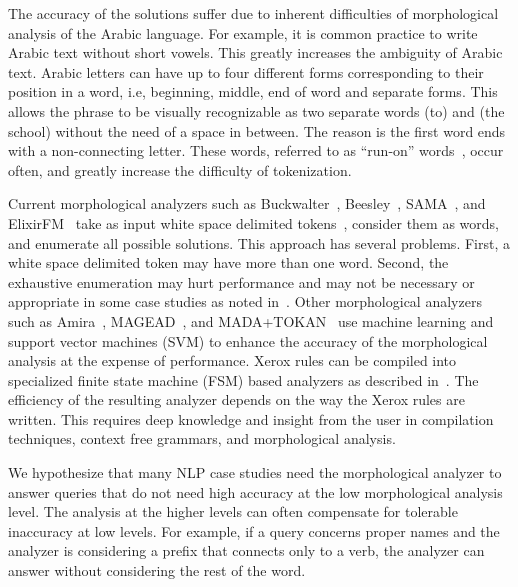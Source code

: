 \documentclass[11pt]{article}
\begin{document}
\novocalize
The accuracy of the solutions suffer due to inherent difficulties
of morphological analysis of the Arabic language. 
For example, it is common practice to write Arabic text
without short vowels. 
This greatly increases the ambiguity of Arabic text. 
Arabic letters can have up to 
four different forms
corresponding to their position in a word, i.e, beginning,
middle, end of word and separate forms. 
This allows the phrase \transfalse
{} \transtrue
to be visually recognizable
as two separate words  (to) and  (the school) 
without the need of a space in between. 
The reason is the first word  ends with
 a non-connecting letter. 
These words,
referred to as ``run-on'' words~\cite{Buckwalter:04},
occur often, and greatly increase the
difficulty of tokenization.

Current morphological analyzers such as 
Buckwalter~,
Beesley~,
SAMA~\cite{Kulick:10},
and ElixirFM~\cite{Otakar:07} 
take as input white space delimited tokens~\cite{Kulick:10},
consider them as words,
and enumerate all possible solutions. 
This approach has several problems. 
First, a white space delimited token may have 
more than one word.
Second, the exhaustive enumeration may hurt performance and may
not be necessary or appropriate
in some case studies as noted in~\cite{Maamouri:10}. 
Other morphological analyzers such as 
Amira~\cite{Diab:07,Benajiba:07},
MAGEAD~\cite{Habash:05}, and MADA+TOKAN~\cite{Habash:09} 
use machine learning and support vector machines (SVM) 
to enhance the accuracy of the morphological analysis at the expense 
of performance.
Xerox rules can be compiled into specialized finite state
machine (FSM) based analyzers as described in~\cite{Beesley:03}.
The efficiency of the resulting analyzer depends on the
way the Xerox rules are written. 
This requires deep knowledge and insight from the user
in compilation techniques, context free grammars, 
and morphological analysis.

We hypothesize that many NLP case studies need the 
morphological analyzer to answer queries that do not need 
high accuracy at the low morphological analysis level.
The analysis at the higher levels can often compensate for 
tolerable inaccuracy at low levels. 
For example, if a query concerns proper names and the 
analyzer is considering a 
prefix that connects only to a verb,
the analyzer can answer without considering the 
rest of the word.
\end{document}
